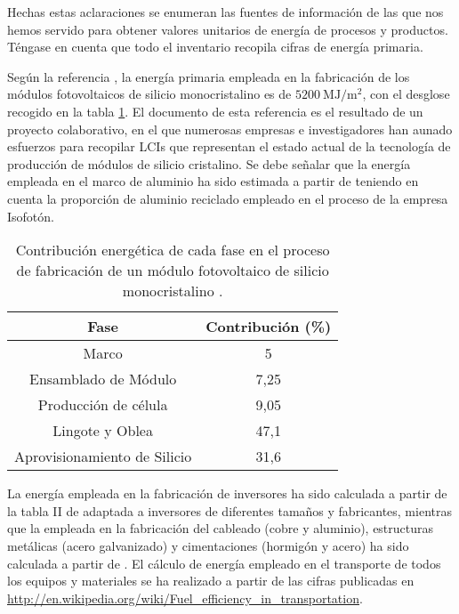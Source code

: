 Hechas estas aclaraciones se enumeran las fuentes de información de
las que nos hemos servido para obtener valores unitarios de energía
de procesos y productos. Téngase en cuenta que todo el inventario
recopila cifras de energía primaria. 

Según la referencia \cite{Alsema.Wild-Scholten2006}, la energía
primaria empleada en la fabricación de los módulos fotovoltaicos de
silicio monocristalino es de
$\SI{5200}{\mega\joule\per\meter\squared}$, con el desglose recogido
en la tabla \ref{tab:ContribucionEnergetica}. El documento de esta
referencia es el resultado de un proyecto colaborativo, en el que
numerosas empresas e investigadores han aunado esfuerzos para
recopilar LCIs que representan el estado actual de la tecnología de
producción de módulos de silicio cristalino. Se debe señalar que la
energía empleada en el marco de aluminio ha sido estimada a partir de
\cite{Baird.Alcorn.ea1997} teniendo en cuenta la proporción de
aluminio reciclado empleado en el proceso de la empresa Isofotón.

\begin{table}[p]
  \caption[Contribución energética de cada fase en el proceso de fabricación
  de un módulo fotovoltaico de silicio monocristalino.]{\label{tab:ContribucionEnergetica}Contribución energética
    de cada fase en el proceso de fabricación de un módulo fotovoltaico
    de silicio monocristalino \cite{Alsema.Wild-Scholten2006}.}

\centering{}%
\begin{tabular}{cc}
\toprule
Fase & Contribución (\%)\tabularnewline
\midrule
Marco & 5\tabularnewline
\midrule
Ensamblado de Módulo & 7,25\tabularnewline
\midrule
Producción de célula & 9,05\tabularnewline
\midrule
Lingote y Oblea & 47,1\tabularnewline
\midrule
Aprovisionamiento de Silicio & 31,6\tabularnewline
\bottomrule
\end{tabular}
\end{table}


La energía empleada en la fabricación de inversores ha sido calculada
a partir de la tabla II de \cite{Alsema.Wild-Scholten2006} adaptada a
inversores de diferentes tamaños y fabricantes, mientras que la
empleada en la fabricación del cableado (cobre y aluminio),
estructuras metálicas (acero galvanizado) y cimentaciones (hormigón y
acero) ha sido calculada a partir de \cite{Baird.Alcorn.ea1997}. El
cálculo de energía empleado en el transporte de todos los equipos y
materiales se ha realizado a partir de las cifras publicadas en
\url{http://en.wikipedia.org/wiki/Fuel_efficiency_in_transportation}.

